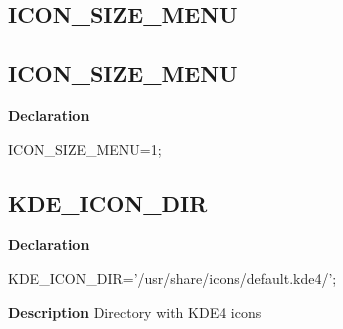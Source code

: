 \documentclass{report}
\newif\ifpdf
\begin{document}
\subsection*{\large{\textbf{ICON{\_}SIZE{\_}MENU}}\normalsize\hspace{1ex}\hrulefill}
\else
\subsection*{ICON{\_}SIZE{\_}MENU}
\fi
\label{licommon-ICON_SIZE_MENU}
\begin{list}{}{
\setlength{\itemindent}{0cm}
\setlength{\listparindent}{0cm}
\setlength{\leftmargin}{\evensidemargin}
\addtolength{\leftmargin}{\tmplength}
\settowidth{\labelsep}{X}
\addtolength{\leftmargin}{\labelsep}
\setlength{\labelwidth}{\tmplength}
}
\item[\textbf{Declaration}\hfill]
\ifpdf
\begin{flushleft}
\fi
\begin{ttfamily}
ICON{\_}SIZE{\_}MENU=1;\end{ttfamily}

\ifpdf
\end{flushleft}
\fi

\end{list}
\ifpdf
\subsection*{\large{\textbf{KDE{\_}ICON{\_}DIR}}\normalsize\hspace{1ex}\hrulefill}
\else
\subsection*{KDE{\_}ICON{\_}DIR}
\fi
\label{licommon-KDE_ICON_DIR}
\begin{list}{}{
\setlength{\itemindent}{0cm}
\setlength{\listparindent}{0cm}
\setlength{\leftmargin}{\evensidemargin}
\addtolength{\leftmargin}{\tmplength}
\settowidth{\labelsep}{X}
\addtolength{\leftmargin}{\labelsep}
\setlength{\labelwidth}{\tmplength}
}
\item[\textbf{Declaration}\hfill]
\ifpdf
\begin{flushleft}
\fi
\begin{ttfamily}
KDE{\_}ICON{\_}DIR='/usr/share/icons/default.kde4/';\end{ttfamily}

\ifpdf
\end{flushleft}
\fi

\par
\item[\textbf{Description}]
Directory with KDE4 icons

\end{list}
\end{document}
